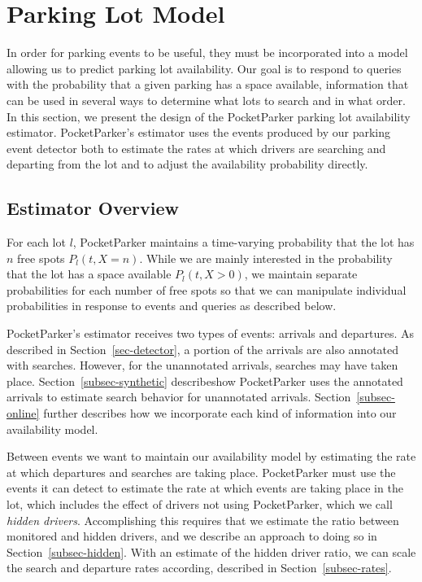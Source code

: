 \section{Parking Lot Model}
\label{sec-model}

In order for parking events to be useful, they must be incorporated into a
model allowing us to predict parking lot availability. Our goal is to respond
to queries with the probability that a given parking has a space available,
information that can be used in several ways to determine what lots to search
and in what order. In this section, we present the design of the PocketParker
parking lot availability estimator. PocketParker's estimator uses the events
produced by our parking event detector both to estimate the rates at which
drivers are searching and departing from the lot and to adjust the
availability probability directly.

\subsection{Estimator Overview}

For each lot $l$, PocketParker maintains a time-varying probability that the
lot has $n$ free spots $P_l(t, X = n)$. While we are mainly interested in the
probability that the lot has a space available $P_l(t, X > 0)$, we maintain
separate probabilities for each number of free spots so that we can
manipulate individual probabilities in response to events and queries as
described below.

PocketParker's estimator receives two types of events: arrivals and
departures. As described in Section~\ref{sec-detector}, a portion of the
arrivals are also annotated with searches. However, for the unannotated
arrivals, searches may have taken place. Section~\ref{subsec-synthetic}
describeshow PocketParker uses the annotated arrivals to estimate search
behavior for unannotated arrivals. Section~\ref{subsec-online} further
describes how we incorporate each kind of information into our availability
model.

Between events we want to maintain our availability model by estimating the
rate at which departures and searches are taking place. PocketParker must use
the events it can detect to estimate the rate at which events are taking
place in the lot, which includes the effect of drivers not using
PocketParker, which we call \textit{hidden drivers}. Accomplishing this
requires that we estimate the ratio between monitored and hidden drivers, and
we describe an approach to doing so in Section~\ref{subsec-hidden}. With an
estimate of the hidden driver ratio, we can scale the search and departure
rates according, described in Section~\ref{subsec-rates}.

